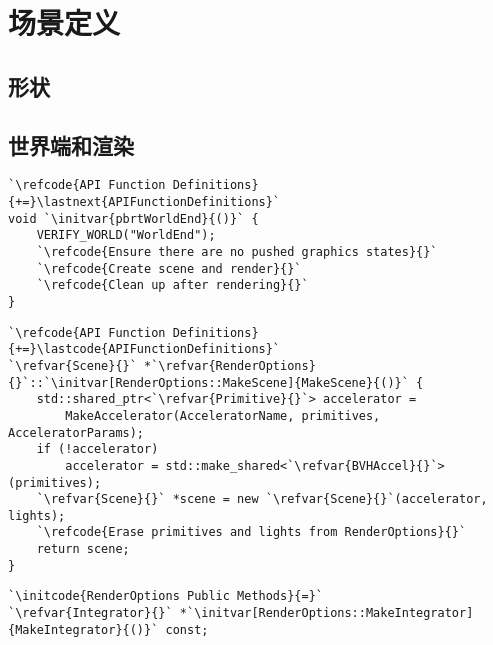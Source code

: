 \section{场景定义}\label{sec:场景定义}

\subsection{形状}\label{sub:形状}
{}

\subsection{世界端和渲染}\label{sub:世界端和渲染}
\begin{lstlisting}
`\refcode{API Function Definitions}{+=}\lastnext{APIFunctionDefinitions}`
void `\initvar{pbrtWorldEnd}{()}` {
    VERIFY_WORLD("WorldEnd");
    `\refcode{Ensure there are no pushed graphics states}{}`
    `\refcode{Create scene and render}{}`
    `\refcode{Clean up after rendering}{}`
}
\end{lstlisting}

\begin{lstlisting}
`\refcode{API Function Definitions}{+=}\lastcode{APIFunctionDefinitions}`
`\refvar{Scene}{}` *`\refvar{RenderOptions}{}`::`\initvar[RenderOptions::MakeScene]{MakeScene}{()}` {
    std::shared_ptr<`\refvar{Primitive}{}`> accelerator =
        MakeAccelerator(AcceleratorName, primitives, AcceleratorParams);
    if (!accelerator)
        accelerator = std::make_shared<`\refvar{BVHAccel}{}`>(primitives);
    `\refvar{Scene}{}` *scene = new `\refvar{Scene}{}`(accelerator, lights);
    `\refcode{Erase primitives and lights from RenderOptions}{}`
    return scene;
}
\end{lstlisting}

\begin{lstlisting}
`\initcode{RenderOptions Public Methods}{=}` 
`\refvar{Integrator}{}` *`\initvar[RenderOptions::MakeIntegrator]{MakeIntegrator}{()}` const;
\end{lstlisting}